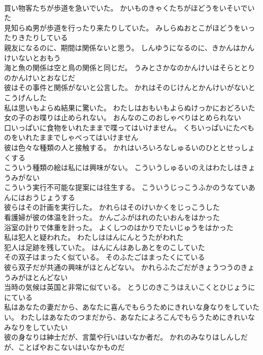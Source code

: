 \documentclass[8pt]{extreport}
\begin{document}
\begin{CJK}{UTF8}{min}
\\	買い物客たちが歩道を急いでいた。	かいものきゃくたちがほどうをいそいでいた 
\\	見知らぬ男が歩道を行ったり来たりしていた。	みしらぬおとこがほどうをいったりきたりしている 
\\	親友になるのに、期間は関係ないと思う。	しんゆうになるのに、きかんはかんけいないとおもう 
\\	海と魚の関係は空と鳥の関係と同じだ。	うみとさかなのかんけいはそらととりのかんけいとおなじだ 
\\	彼はその事件と関係がないと公言した。	かれはそのじけんとかんけいがないとこうげんした 
\\	私は思いもよらぬ結果に驚いた。	わたしはおもいもよらぬけっかにおどろいた 
\\	女の子のお喋りは止められない。	おんなのこのおしゃべりはとめられない 
\\	口いっぱいに食物をいれたままで喋ってはいけません。	くちいっぱいにたべものをいれたままでしゃべってはいけません 
\\	彼は色々な種類の人と接触する。	かれはいろいろなしゅるいのひととせっしょくする 
\\	こういう種類の絵は私には興味がない。	こういうしゅるいのえはわたしはきょうみがない 
\\	こういう実行不可能な提案には往生する。	こういうじっこうふかのうなていあんにはおうじょうする 
\\	彼らはその計画を実行した。	かれらはそのけいかくをじっこうした 
\\	看護婦が彼の体温を計った。	かんごふがはれのたいおんをはかった 
\\	浴室の計りで体重を計った。	よくしつのはかりでたいじゅうをはかった 
\\	私は犯人と疑われた。	わたしははんにんとうたがわれた 
\\	犯人は足跡を残していた。	はんにんはあしあとをのこしていた 
\\	その双子はまったく似ている。	そのふたごはまったくにている 
\\	彼ら双子だが共通の興味がほとんどない。	かれらふたごだがきょうつうのきょうみがほとんどない 
\\	当時の気候は英国と非常に似ている。	とうじのきこうはえいこくとひじょうににている 
\\	私はあなたの妻だから、あなたに喜んでもらうためにきれいな身なりをしていたい。	わたしはあなたのつまだから、あなたによろこんでもらうためにきれいなみなりをしていたい 
\\	彼の身なりは紳士だが、言葉や行いはいなか者だ。	かれのみなりはしんしだが、ことばやおこないはいなかものだ 

\end{CJK}
\end{document}

